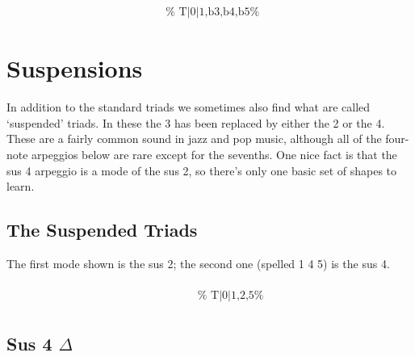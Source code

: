 \documentclass[english]{./gbook}
\begin{document}
\begin{large}
\[\begin{array}{ll}
&
	\text{
	}
\end{array}
\]


\section{Suspensions}

In addition to the standard triads we sometimes also find what are called `suspended' triads. In these the 3 has been replaced by either the 2 or the 4. These are a fairly common sound in jazz and pop music, although all of the four-note arpeggios below are rare except for the sevenths. One nice fact is that the sus 4 arpeggio is a mode of the sus 2, so there's only one basic set of shapes to learn.

\subsection*{The Suspended Triads}

The first mode shown is the sus 2; the second one (spelled 1 4 5) is the sus 4.

\[
\begin{array}{ll}
	\begin{array}{c}
		\begin{array}{ccc}
			&%
			&%
		\end{array}
		\\
		\begin{array}{cc}
			&%
		\end{array}
	\end{array}

&
	\text{
	}
\end{array}
\]

\subsection*{Sus 4 $\Delta$}

\[
\begin{array}{ll}
	\begin{array}{c}
		\begin{array}{ccc}
			&%
			&%
		\end{array}
		\\
		\begin{array}{cc}
			&%
		\end{array}
	\end{array}


\end{array}\]
\end{large}
\end{document}
